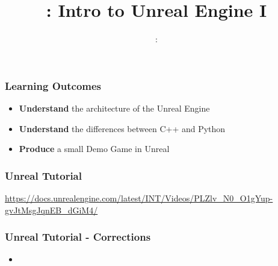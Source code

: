 \usepackage{../../beamerthemeFalmouthGamesAcademy}
\usepackage{multimedia}
\graphicspath{ {../../} }

\usepackage{textcomp}


\usepackage[normalem]{ulem}
\usepackage{wasysym}

\usepackage{pdfpages}

\usetikzlibrary{arrows,automata}







\title{\sessionnumber: Intro to Unreal Engine I}
\subtitle{\modulecode: \moduletitle}

\frame{\titlepage} 

\begin{frame}
	\frametitle{Learning Outcomes}
	\begin{itemize}
		\item \textbf{Understand} the architecture of the Unreal Engine
		\item \textbf{Understand} the differences between C++ and Python
		\item \textbf{Produce} a small Demo Game in Unreal
	\end{itemize}
\end{frame}

\begin{frame}
	\frametitle{Unreal Tutorial}
	\begin{center}
		\url{https://docs.unrealengine.com/latest/INT/Videos/PLZlv_N0_O1gYup-gvJtMsgJqnEB_dGiM4/}
	\end{center}
\end{frame}

\begin{frame}
\frametitle{Unreal Tutorial - Corrections}
	\begin{itemize}
		\item 
	\end{itemize}
\end{frame}
